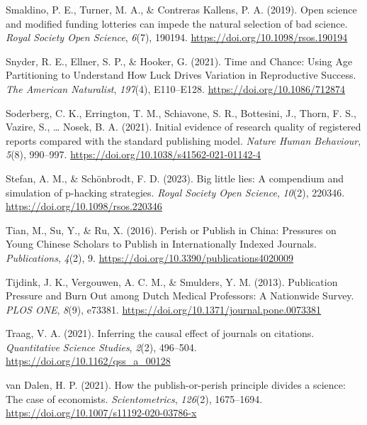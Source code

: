 \documentclass[
  ,man,mask,floatsintext]{apa6}
\newlength{\cslhangindent}
\newlength{\cslentryspacingunit} %
\newenvironment{CSLReferences}[2] %
 {%
  \setlength{\parindent}{0pt}
  \ifodd #1
  \let\oldpar\par
  \def\par{\hangindent=\cslhangindent\oldpar}
  \fi
  \setlength{\parskip}{#2\cslentryspacingunit}
 }%
 {}
\begin{document}
\begin{CSLReferences}{1}{0}
\leavevmode{}%
Smaldino, P. E., Turner, M. A., \& Contreras Kallens, P. A. (2019). Open science and modified funding lotteries can impede the natural selection of bad science. \emph{Royal Society Open Science}, \emph{6}(7), 190194. \url{https://doi.org/10.1098/rsos.190194}

\leavevmode{}%
Snyder, R. E., Ellner, S. P., \& Hooker, G. (2021). Time and {Chance}: {Using Age Partitioning} to {Understand How Luck Drives Variation} in {Reproductive Success}. \emph{The American Naturalist}, \emph{197}(4), E110--E128. \url{https://doi.org/10.1086/712874}

\leavevmode{}%
Soderberg, C. K., Errington, T. M., Schiavone, S. R., Bottesini, J., Thorn, F. S., Vazire, S., \ldots{} Nosek, B. A. (2021). Initial evidence of research quality of registered reports compared with the standard publishing model. \emph{Nature Human Behaviour}, \emph{5}(8), 990--997. \url{https://doi.org/10.1038/s41562-021-01142-4}

\leavevmode{}%
Stefan, A. M., \& Schönbrodt, F. D. (2023). Big little lies: A compendium and simulation of p-hacking strategies. \emph{Royal Society Open Science}, \emph{10}(2), 220346. \url{https://doi.org/10.1098/rsos.220346}

\leavevmode{}%
Tian, M., Su, Y., \& Ru, X. (2016). Perish or {Publish} in {China}: {Pressures} on {Young Chinese Scholars} to {Publish} in {Internationally Indexed Journals}. \emph{Publications}, \emph{4}(2), 9. \url{https://doi.org/10.3390/publications4020009}

\leavevmode{}%
Tijdink, J. K., Vergouwen, A. C. M., \& Smulders, Y. M. (2013). Publication {Pressure} and {Burn Out} among {Dutch Medical Professors}: {A Nationwide Survey}. \emph{PLOS ONE}, \emph{8}(9), e73381. \url{https://doi.org/10.1371/journal.pone.0073381}

\leavevmode{}%
Traag, V. A. (2021). Inferring the causal effect of journals on citations. \emph{Quantitative Science Studies}, \emph{2}(2), 496--504. \url{https://doi.org/10.1162/qss_a_00128}

\leavevmode{}%
van Dalen, H. P. (2021). How the publish-or-perish principle divides a science: The case of economists. \emph{Scientometrics}, \emph{126}(2), 1675--1694. \url{https://doi.org/10.1007/s11192-020-03786-x}


\end{CSLReferences}
\end{document}
